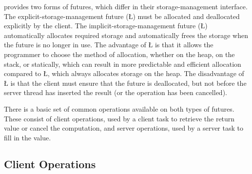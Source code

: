 \documentclass[openright,twoside]{report}
\begin{document}
\uC provides two forms of futures, which differ in their storage-management interface.
The explicit-storage-management future (\LGinlinetrue\LGbegin\lgrinde\L{}\endlgrinde\LGend{}) must be allocated and deallocated explicitly by the client.
The implicit-storage-management future (\LGinlinetrue\LGbegin\lgrinde\L{}\endlgrinde\LGend{}) automatically allocates required storage and automatically frees the storage when the future is no longer in use.
The advantage of \LGinlinetrue\LGbegin\lgrinde\L{}\endlgrinde\LGend{} is that it allows the programmer to choose the method of allocation, whether on the heap, on the stack, or statically, which can result in more predictable and efficient allocation compared to \LGinlinetrue\LGbegin\lgrinde\L{}\endlgrinde\LGend{}, which always allocates storage on the heap.
The disadvantage of \LGinlinetrue\LGbegin\lgrinde\L{}\endlgrinde\LGend{} is that the client must ensure that the future is deallocated, but not before the server thread has inserted the result (or the operation has been cancelled).

There is a basic set of common operations available on both types of futures.
These consist of client operations, used by a client task to retrieve the return value or cancel the computation, and server operations, used by a server task to fill in the value.


\subsection{Client Operations}
\end{document}
